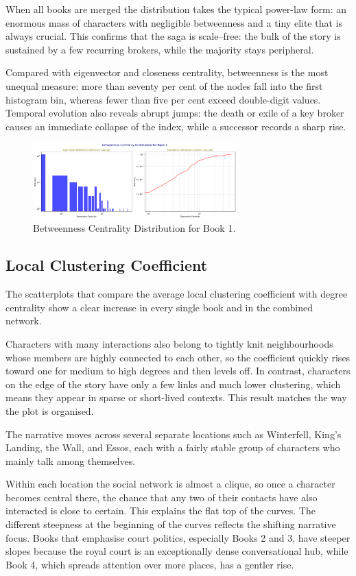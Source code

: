 \documentclass[12pt, a4paper]{article}
\begin{document}
When all books are merged the distribution takes the typical power-law form: an enormous mass of characters with negligible betweenness and a tiny elite that is always crucial. This confirms that the saga is scale–free: the bulk of the story is sustained by a few recurring brokers, while the majority stays peripheral.

Compared with eigenvector and closeness centrality, betweenness is the most unequal measure: more than seventy per cent of the nodes fall into the first histogram bin, whereas fewer than five per cent exceed double-digit values. Temporal evolution also reveals abrupt jumps: the death or exile of a key broker causes an immediate collapse of the index, while a successor records a sharp rise.
\begin{figure}[htbp]
      \centering
      \includegraphics[width=0.7\textwidth]{betweenness-distrib-book1.png}
      \caption{Betweenness Centrality Distribution for Book 1.}
      \label{fig:betweennessbook1}
\end{figure}
\subsection*{Local Clustering Coefficient}
The scatterplots that compare the average local clustering coefficient 
with degree centrality show a clear increase in every single book and in the combined network.

Characters with many interactions also belong to tightly knit neighbourhoods whose members
 are highly connected to each other, so the coefficient quickly rises toward one for medium
 to high degrees and then levels off. In contrast, characters on the edge of the story 
 have only a few links and much lower clustering, which means they appear in sparse or 
 short-lived contexts. This result matches the way the plot is organised. 
 
 The narrative moves across several separate locations such as Winterfell, King's Landing, 
 the Wall, and Essos, each with a fairly stable group of characters who mainly talk among 
 themselves.
 
 Within each location the social network is almost a clique, 
 so once a character becomes central there, the chance that any 
 two of their contacts have also interacted is close to certain. 
 This explains the flat top of the curves.
   The different steepness at the beginning of the curves reflects the shifting narrative focus.
   Books that emphasise court politics, especially Books 2 and 3, 
   have steeper slopes because the royal court is an exceptionally 
   dense conversational hub, while Book 4, which spreads attention over more places, 
   has a gentler rise. 
   
\end{document}
